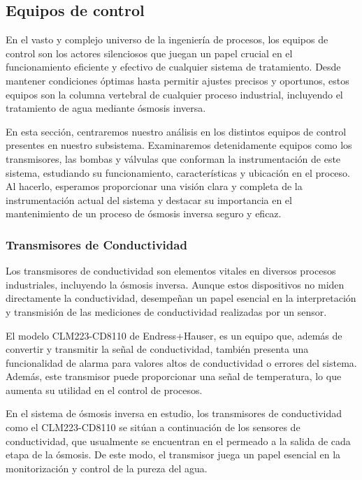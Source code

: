\subsection{Equipos de control}

En el vasto y complejo universo de la ingeniería de procesos, los equipos de
control son los actores silenciosos que juegan un papel crucial en el funcionamiento eficiente y
efectivo de cualquier sistema de tratamiento. Desde mantener condiciones óptimas hasta permitir ajustes precisos y
oportunos, estos equipos son la columna vertebral de cualquier proceso industrial, incluyendo el tratamiento de agua
mediante ósmosis inversa.

En esta sección, centraremos nuestro análisis en los distintos equipos de control presentes en nuestro subsistema.
Examinaremos detenidamente equipos como los transmisores, las bombas y válvulas que conforman
la instrumentación de este sistema, estudiando su funcionamiento, características y
ubicación en el proceso. Al hacerlo, esperamos proporcionar una visión clara y completa de la instrumentación
actual del sistema y destacar su importancia en el mantenimiento de un proceso de ósmosis inversa seguro y eficaz.





\subsubsection{Transmisores de Conductividad } \label{sec:transmisor_conductividad}

Los transmisores de conductividad son elementos vitales en diversos procesos industriales, incluyendo la ósmosis inversa. Aunque estos dispositivos no miden directamente la conductividad, desempeñan un papel esencial en la interpretación y transmisión de las mediciones de conductividad realizadas por un sensor.

El modelo CLM223-CD8110 de Endress+Hauser, es un equipo que, además de convertir y transmitir la señal de conductividad, también presenta
una funcionalidad de alarma para valores altos de conductividad o errores del sistema. Además, este transmisor puede proporcionar una señal
de temperatura, lo que aumenta su utilidad en el control de procesos.

En el sistema de ósmosis inversa en estudio, los transmisores de conductividad como el CLM223-CD8110 se sitúan a continuación
de los sensores de conductividad, que usualmente se encuentran en el permeado a la salida de cada etapa de la ósmosis. De este modo, el
transmisor juega un papel esencial en la monitorización y control de la pureza del agua.

